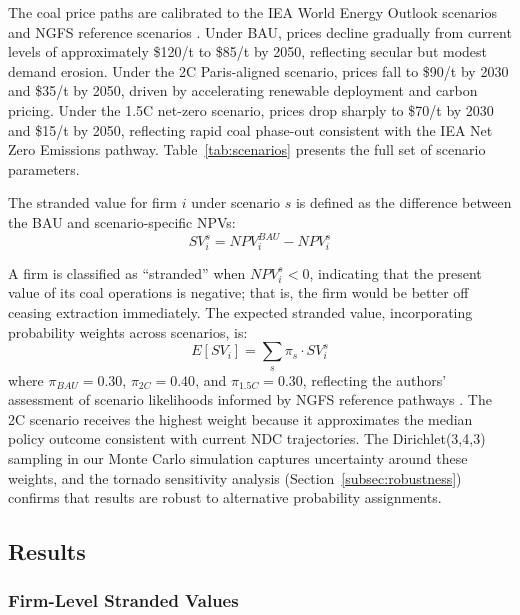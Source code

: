 The coal price paths are calibrated to the IEA World Energy Outlook scenarios \citep{IEA2023} and NGFS reference scenarios \citep{NGFS2022}. Under BAU, prices decline gradually from current levels of approximately \$120/t to \$85/t by 2050, reflecting secular but modest demand erosion. Under the 2\textdegree C Paris-aligned scenario, prices fall to \$90/t by 2030 and \$35/t by 2050, driven by accelerating renewable deployment and carbon pricing. Under the 1.5\textdegree C net-zero scenario, prices drop sharply to \$70/t by 2030 and \$15/t by 2050, reflecting rapid coal phase-out consistent with the IEA Net Zero Emissions pathway. Table~\ref{tab:scenarios} presents the full set of scenario parameters.



The stranded value for firm $i$ under scenario $s$ is defined as the difference between the BAU and scenario-specific NPVs:
\begin{equation}
\label{eq:sv}
SV_i^s = NPV_i^{BAU} - NPV_i^s
\end{equation}

A firm is classified as ``stranded'' when $NPV_i^s < 0$, indicating that the present value of its coal operations is negative; that is, the firm would be better off ceasing extraction immediately. The expected stranded value, incorporating probability weights across scenarios, is:
\begin{equation}
\label{eq:expected_sv}
E[SV_i] = \sum_{s} \pi_s \cdot SV_i^s
\end{equation}
where $\pi_{BAU} = 0.30$, $\pi_{2C} = 0.40$, and $\pi_{1.5C} = 0.30$, reflecting the authors' assessment of scenario likelihoods informed by NGFS reference pathways \citep{NGFS2022}. The 2\textdegree C scenario receives the highest weight because it approximates the median policy outcome consistent with current NDC trajectories. The Dirichlet(3,4,3) sampling in our Monte Carlo simulation captures uncertainty around these weights, and the tornado sensitivity analysis (Section~\ref{subsec:robustness}) confirms that results are robust to alternative probability assignments.



\subsection{Results}
\label{subsec:model1_results}

\subsubsection{Firm-Level Stranded Values}

